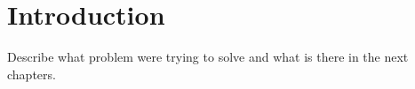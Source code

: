 \chapter*{Introduction}
Describe what problem were trying to solve and what is there in the next chapters.
